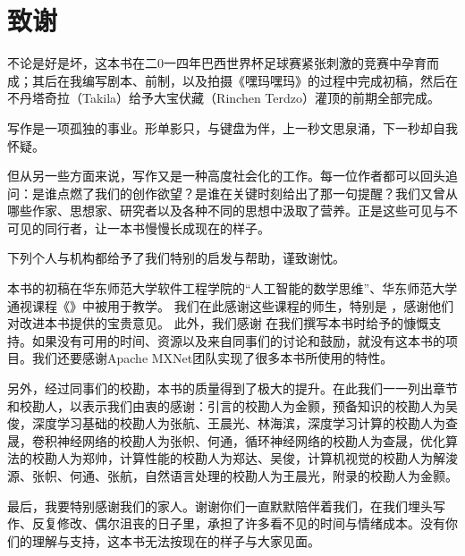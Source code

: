 
\chapter*{ 致谢}

不论是好是坏，这本书在二0一四年巴西世界杯足球赛紧张刺激的竞赛中孕育而成；其后在我编写剧本、前制，以及拍摄《嘿玛嘿玛》的过程中完成初稿，然后在不丹塔奇拉（Takila）给予大宝伏藏（Rinchen Terdzo）灌顶的前期全部完成。

写作是一项孤独的事业。形单影只，与键盘为伴，上一秒文思泉涌，下一秒却自我怀疑。

但从另一些方面来说，写作又是一种高度社会化的工作。每一位作者都可以回头追问：是谁点燃了我们的创作欲望？是谁在关键时刻给出了那一句提醒？我们又曾从哪些作家、思想家、研究者以及各种不同的思想中汲取了营养。正是这些可见与不可见的同行者，让一本书慢慢长成现在的样子。

下列个人与机构都给予了我们特别的启发与帮助，谨致谢忱。
 
本书的初稿在华东师范大学软件工程学院的“人工智能的数学思维”、华东师范大学通视课程《》中被用于教学。
我们在此感谢这些课程的师生，特别是  ，感谢他们对改进本书提供的宝贵意见。
此外，我们感谢
在我们撰写本书时给予的慷慨支持。如果没有可用的时间、资源以及来自同事们的讨论和鼓励，就没有这本书的项目。我们还要感谢Apache MXNet团队实现了很多本书所使用的特性。

另外，经过同事们的校勘，本书的质量得到了极大的提升。在此我们一一列出章节和校勘人，以表示我们由衷的感谢：引言的校勘人为金颢，预备知识的校勘人为吴俊，深度学习基础的校勘人为张航、王晨光、林海滨，深度学习计算的校勘人为查晟，卷积神经网络的校勘人为张帜、何通，循环神经网络的校勘人为查晟，优化算法的校勘人为郑帅，计算性能的校勘人为郑达、吴俊，计算机视觉的校勘人为解浚源、张帜、何通、张航，自然语言处理的校勘人为王晨光，附录的校勘人为金颢。
%
%

最后，我要特别感谢我们的家人。谢谢你们一直默默陪伴着我们，在我们埋头写作、反复修改、偶尔沮丧的日子里，承担了许多看不见的时间与情绪成本。没有你们的理解与支持，这本书无法按现在的样子与大家见面。
